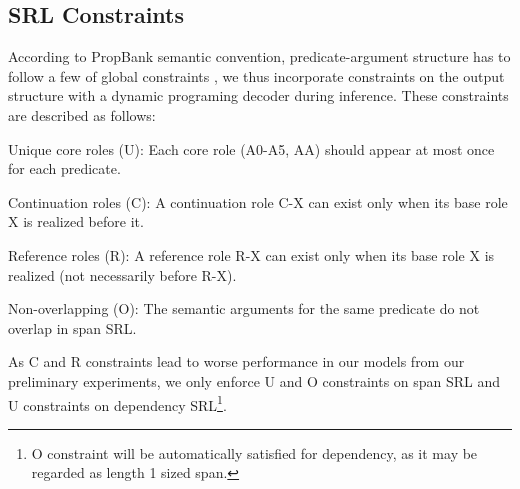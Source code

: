 \documentclass[letterpaper]{article} \usepackage{aaai19}  \usepackage{times}  \usepackage{helvet}  \usepackage{courier}  \usepackage{url}  \usepackage{graphicx}  \frenchspacing  \setlength{\pdfpagewidth}{8.5in}  \setlength{\pdfpageheight}{11in}
\begin{document}
\subsection{SRL Constraints}
According to PropBank semantic convention, predicate-argument structure has to follow a few of global constraints \cite{punyakanok2008importance,he-acl2017}, we thus incorporate constraints on the output structure with a dynamic programing decoder during inference. These constraints are described as follows:

 Unique core roles (U): Each core role (A0-A5, AA) should appear at most once for each predicate.

 Continuation roles (C): A continuation role C-X can exist only when its base role X is realized before it.

 Reference roles (R): A reference role R-X can exist only when its base role X is realized (not necessarily before R-X).

 Non-overlapping (O): The semantic arguments for the same predicate do not overlap in span SRL.

As C and R constraints lead to worse performance in our models from our preliminary experiments, we only enforce U and O constraints on span SRL and U constraints on dependency SRL\footnote{O constraint will be automatically satisfied for dependency, as it may be regarded as length 1 sized span.}. 
\end{document}
